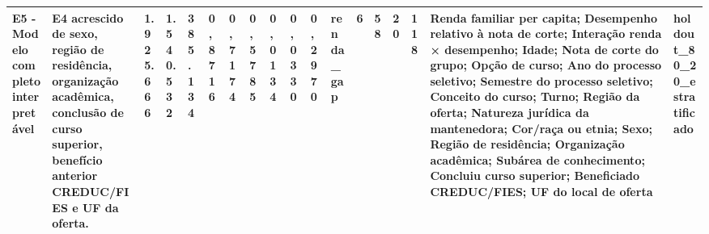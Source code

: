 \begin{table}
\begin{tabular}{llllllllllllllllll}
E5 - Modelo completo interpretável & E4 acrescido de sexo, região de residência, organização acadêmica, conclusão de curso superior, benefício anterior CREDUC/FIES e UF da oferta. & 1.925.666 & 1.540.532 & 385.134 & 0,8716 & 0,7174 & 0,5785 & 0,0134 & 0,0330 & 0,2970 & renda\_gap & 6 & 58 & 20 & 118 & Renda familiar per capita; Desempenho relativo à nota de corte; Interação renda × desempenho; Idade; Nota de corte do grupo; Opção de curso; Ano do processo seletivo; Semestre do processo seletivo; Conceito do curso; Turno; Região da oferta; Natureza jurídica da mantenedora; Cor/raça ou etnia; Sexo; Região de residência; Organização acadêmica; Subárea de conhecimento; Concluiu curso superior; Beneficiado CREDUC/FIES; UF do local de oferta & holdout\_80\_20\_estratificado \\
\bottomrule
\end{tabular}
\end{table}
